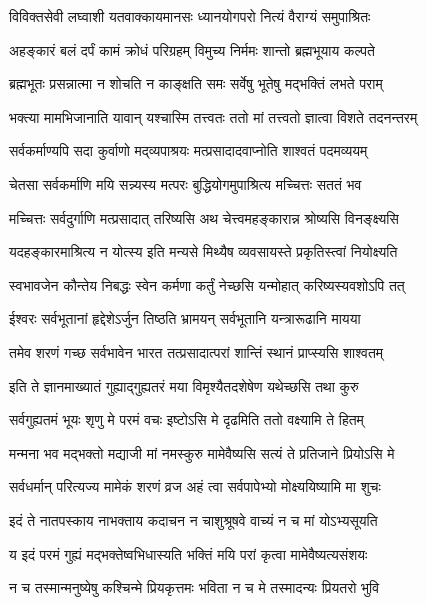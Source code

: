 \twolineshloka
{विविक्तसेवी लघ्वाशी यतवाक्कायमानसः}
{ध्यानयोगपरो नित्यं वैराग्यं समुपाश्रितः}%

\twolineshloka
{अहङ्कारं बलं दर्पं कामं क्रोधं परिग्रहम्}
{विमुच्य निर्ममः शान्तो ब्रह्मभूयाय कल्पते}%

\twolineshloka
{ब्रह्मभूतः प्रसन्नात्मा न शोचति न काङ्क्षति}
{समः सर्वेषु भूतेषु मद्भक्तिं लभते पराम्}%

\twolineshloka
{भक्त्या मामभिजानाति यावान् यश्चास्मि तत्त्वतः}
{ततो मां तत्त्वतो ज्ञात्वा विशते तदनन्तरम्}%

\twolineshloka
{सर्वकर्माण्यपि सदा कुर्वाणो मद्‌व्यपाश्रयः}
{मत्प्रसादादवाप्नोति शाश्वतं पदमव्ययम्}%

\twolineshloka
{चेतसा सर्वकर्माणि मयि सन्न्यस्य मत्परः}
{बुद्धियोगमुपाश्रित्य मच्चित्तः सततं भव}%

\twolineshloka
{मच्चित्तः सर्वदुर्गाणि मत्प्रसादात् तरिष्यसि}
{अथ चेत्त्वमहङ्कारान्न श्रोष्यसि विनङ्क्ष्यसि}%

\twolineshloka
{यदहङ्कारमाश्रित्य न योत्स्य इति मन्यसे}
{मिथ्यैष व्यवसायस्ते प्रकृतिस्त्वां नियोक्ष्यति}%

\twolineshloka
{स्वभावजेन कौन्तेय निबद्धः स्वेन कर्मणा}
{कर्तुं नेच्छसि यन्मोहात् करिष्यस्यवशोऽपि तत्}%

\twolineshloka
{ईश्वरः सर्वभूतानां हृद्देशेऽर्जुन तिष्ठति}
{भ्रामयन् सर्वभूतानि यन्त्रारूढानि मायया}%

\twolineshloka
{तमेव शरणं गच्छ सर्वभावेन भारत}
{तत्प्रसादात्परां शान्तिं स्थानं प्राप्स्यसि शाश्वतम्}
{}%

\twolineshloka
{इति ते ज्ञानमाख्यातं गुह्याद्गुह्यतरं मया}
{विमृश्यैतदशेषेण यथेच्छसि तथा कुरु}%

\twolineshloka
{सर्वगुह्यतमं भूयः शृणु मे परमं वचः}
{इष्टोऽसि मे दृढमिति ततो वक्ष्यामि ते हितम्}%

\twolineshloka
{मन्मना भव मद्भक्तो मद्याजी मां नमस्कुरु}
{मामेवैष्यसि सत्यं ते प्रतिजाने प्रियोऽसि मे}%

\twolineshloka
{सर्वधर्मान् परित्यज्य मामेकं शरणं व्रज}
{अहं त्वा सर्वपापेभ्यो मोक्ष्ययिष्यामि मा शुचः}%

\twolineshloka
{इदं ते नातपस्काय नाभक्ताय कदाचन}
{न चाशुश्रूषवे वाच्यं न च मां योऽभ्यसूयति}%

\twolineshloka
{य इदं परमं गुह्यं मद्भक्तेष्वभिधास्यति}
{भक्तिं मयि परां कृत्वा मामेवैष्यत्यसंशयः}%

\twolineshloka
{न च तस्मान्मनुष्येषु कश्चिन्मे प्रियकृत्तमः}
{भविता न च मे तस्मादन्यः प्रियतरो भुवि}%

